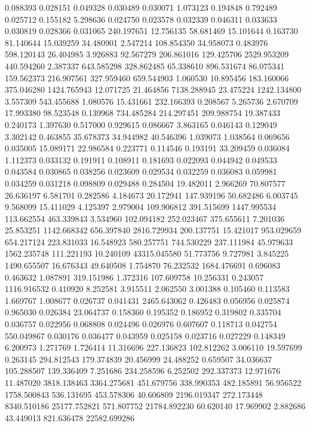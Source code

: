 0.088393
0.028151
0.049328
0.030489
0.030071
1.073123
0.194848
0.792489
0.025712
0.155182
5.298636
0.024750
0.023578
0.032339
0.046311
0.033633
0.030819
0.028366
0.031065
240.197651
12.756135
58.681469
15.101644
0.163730
81.140644
15.039259
34.480901
2.547214
108.854350
34.958073
0.483976
598.120143
26.404985
3.926883
92.567279
206.861016
129.425706
2529.953209
440.594260
2.387337
643.585298
328.862485
65.338610
896.531674
86.075341
159.562373
216.907561
327.959460
659.544903
1.060530
10.895456
183.160066
375.046280
1424.765943
12.071725
21.464856
7138.288945
23.475224
1242.134800
3.557309
543.455688
1.080576
15.431661
232.166393
0.208567
5.265736
2.670709
17.993380
98.523548
0.139968
734.485284
214.297451
209.988754
19.387433
0.240173
1.397630
0.517000
0.929615
0.086667
3.863165
0.046143
0.129049
3.302142
0.463855
35.678373
34.944982
40.546396
1.039073
1.038564
0.069656
0.035005
15.089171
22.986584
0.223771
0.114546
0.193191
33.209459
0.036084
1.112373
0.033132
0.191911
0.108911
0.181693
0.022093
0.044942
0.049533
0.043584
0.030865
0.038256
0.023609
0.029534
0.032259
0.036083
0.059981
0.034259
0.031218
0.098809
0.029488
0.284504
19.482011
2.966269
70.807577
26.636197
6.581701
0.282586
4.184673
20.172941
147.939196
50.682486
6.003745
9.568099
15.411029
4.125397
2.979004
109.906812
391.515699
1447.995534
113.662554
463.339843
3.534960
102.094182
252.023467
375.655611
7.201036
25.853251
1142.668342
656.397840
2816.729934
200.137751
15.421017
953.029659
654.217124
223.831033
16.548923
580.257751
744.530229
237.111984
45.979633
1562.235748
111.221193
10.240109
43315.045580
51.773756
9.727981
3.845225
1490.655507
16.676343
49.640508
1.754870
76.232532
1684.476691
0.696083
0.463632
1.087891
319.151986
1.372316
107.609758
10.256331
0.243057
1116.916532
0.410920
8.252581
3.915511
2.062550
3.001388
0.105460
0.113583
1.669767
1.008677
0.026737
0.041431
2465.643062
0.426483
0.056956
0.025874
0.965030
0.026384
23.064737
0.158360
0.195352
0.186952
0.319802
0.335704
0.036757
0.022956
0.068808
0.024496
0.026976
0.607607
0.118713
0.042754
550.049867
0.030176
0.036477
0.043959
0.025158
0.023716
0.027229
0.148349
6.200973
1.271769
1.726414
11.316696
227.136823
102.812262
3.006110
19.597699
0.263145
294.812543
179.374839
20.456999
24.488252
0.659507
34.036637
105.288507
139.336409
7.251686
234.258596
6.252502
292.337373
12.971676
11.487020
3818.138463
3364.275681
451.679756
338.990353
482.185891
56.956522
1758.500843
536.131695
453.578306
40.606809
2196.019347
272.173448
8340.510186
25177.752821
571.807752
21784.892230
60.620140
17.969902
2.882686
43.449013
821.636478
22582.699286
